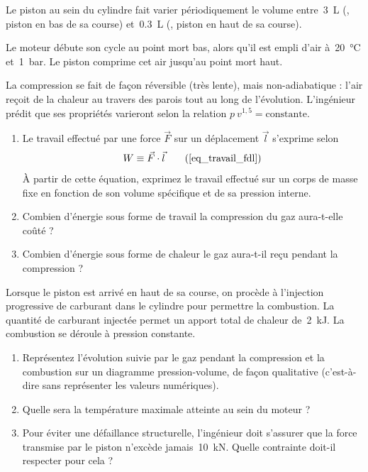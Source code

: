 	Le piston au sein du cylindre fait varier périodiquement le volume entre~\SI{3}{\liter} (, piston en bas de sa course) et~\SI{0,3}{\liter} (, piston en haut de sa course).
	
	Le moteur débute son cycle au point mort bas, alors qu’il est empli d’air à~\SI{20}{\degreeCelsius} et~\SI{1}{\bar}. Le piston comprime cet air jusqu’au point mort haut.
	
	La compression se fait de façon réversible (très lente), mais non-adiabatique : l’air reçoit de la chaleur au travers des parois tout au long de l’évolution. L’ingénieur prédit que ses propriétés varieront selon la relation $p \ v^{1,5} = \text{constante}$.


	\begin{enumerate}
		\item Le travail effectué par une force $\vec F$ sur un déplacement $\vec l$ s’exprime selon
			\begin{equation}
				W \equiv \vec F \cdot \vec l 	\tag{\ref{eq_travail_fdl}}
			\end{equation}
			À partir de cette équation, exprimez le travail effectué sur un corps de masse fixe en fonction de son volume spécifique et de sa pression interne.
		\item Combien d’énergie sous forme de travail la compression du gaz aura-t-elle coûté ?
		\item Combien d’énergie sous forme de chaleur le gaz aura-t-il reçu pendant la compression ?
	\end{enumerate}

	Lorsque le piston est arrivé en haut de sa course, on procède à l’injection progressive de carburant dans le cylindre pour permettre la combustion. La quantité de carburant injectée permet un apport total de chaleur de~\SI{2}{\kilo\joule}. La combustion se déroule à pression constante.
	
	\begin{enumerate}
		\item Représentez l’évolution suivie par le gaz pendant la compression et la combustion sur un diagramme pression-volume, de façon qualitative (c’est-à-dire sans représenter les valeurs numériques).
		\item Quelle sera la température maximale atteinte au sein du moteur ?
		\item Pour éviter une défaillance structurelle, l’ingénieur doit s’assurer que la force transmise par le piston n’excède jamais~\SI{10}{\kilo\newton}. Quelle contrainte doit-il respecter pour cela ?
	\end{enumerate}
	

